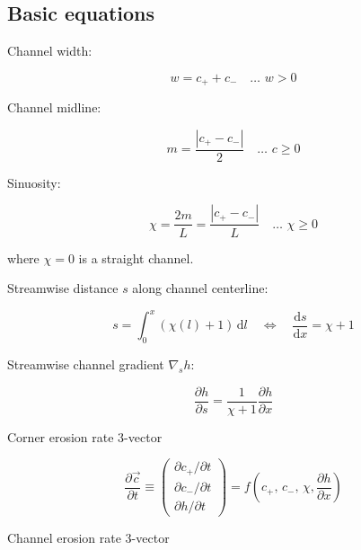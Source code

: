 \documentclass[11pt]{article}
\begin{document}
    \subsection{Basic equations}\label{basic-equations}

    Channel width:

\begin{equation}
    w = c_{+} + c_{-}  \quad\dots\,\, w > 0
\end{equation}

Channel midline:

\begin{equation}
    m = \dfrac{\left| c_{+} - c_{-} \right|}{2}
      \quad\dots\,\, c \geq 0
\end{equation}

Sinuosity:

\begin{equation}
    \chi = \dfrac{2m}{L} 
    = \dfrac{\left| c_{+} - c_{-} \right|}{L} 
       \quad\dots\,\, \chi \geq 0
\end{equation}

where \(\chi=0\) is a straight channel.

Streamwise distance \(s\) along channel centerline:

\begin{equation}\displaystyle
    s = \int_0^x \left( \chi(l)+1 \right) \,\mathrm{d}l
    \quad\Leftrightarrow\quad
    \frac{\mathrm{d}s}{\mathrm{d}x} = \chi+1
\end{equation}

Streamwise channel gradient \(\nabla_s h\):

\begin{equation}
    \dfrac{\partial{h}}{\partial{s}} 
    = \dfrac{1}{\chi+1}\dfrac{\partial{h}}{\partial{x}}
\end{equation}

    Corner erosion rate 3-vector

\begin{equation}
    \dfrac{\partial{\vec{c}}}{\partial{t}}
    \equiv 
    \begin{pmatrix}
        \partial{c_{+}}/\partial{t} \\
        \partial{c_{-}}/\partial{t} \\
        \partial{h}/\partial{t}
    \end{pmatrix}
    = f\!\left(c_{+},\,c_{-},\, \chi, \dfrac{\partial{h}}{\partial{x}}\right)
\end{equation}

Channel erosion rate 3-vector
\end{document}
